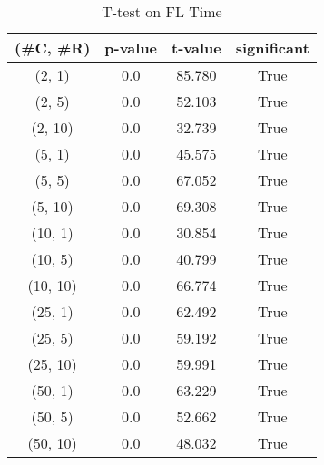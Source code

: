 \begin{table}[h]
\centering
\caption{T-test on FL Time}
\label{tab:t-testFL}
\begin{tabular}{|c|c|c|c|}
\toprule
(\#C, \#R) &  p-value &  t-value &  significant \\
\midrule
  (2, 1) &      0.0 &   85.780 &         True \\
  (2, 5) &      0.0 &   52.103 &         True \\
 (2, 10) &      0.0 &   32.739 &         True \\
  (5, 1) &      0.0 &   45.575 &         True \\
  (5, 5) &      0.0 &   67.052 &         True \\
 (5, 10) &      0.0 &   69.308 &         True \\
 (10, 1) &      0.0 &   30.854 &         True \\
 (10, 5) &      0.0 &   40.799 &         True \\
(10, 10) &      0.0 &   66.774 &         True \\
 (25, 1) &      0.0 &   62.492 &         True \\
 (25, 5) &      0.0 &   59.192 &         True \\
(25, 10) &      0.0 &   59.991 &         True \\
 (50, 1) &      0.0 &   63.229 &         True \\
 (50, 5) &      0.0 &   52.662 &         True \\
(50, 10) &      0.0 &   48.032 &         True \\
\bottomrule
\end{tabular}
\end{table}
